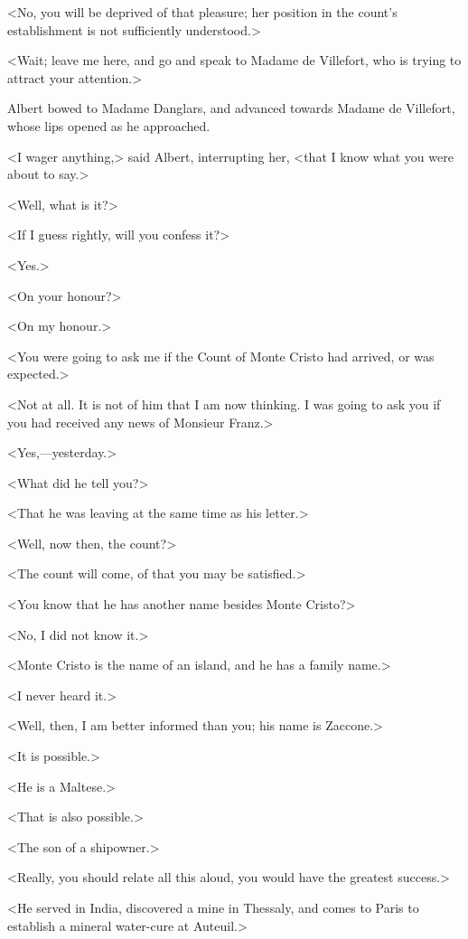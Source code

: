  <No, you will be deprived of that pleasure; her position in the count's establishment is not sufficiently understood.> 

 <Wait; leave me here, and go and speak to Madame de Villefort, who is trying to attract your attention.> 

 Albert bowed to Madame Danglars, and advanced towards Madame de Villefort, whose lips opened as he approached. 

 <I wager anything,> said Albert, interrupting her, <that I know what you were about to say.> 

 <Well, what is it?> 

 <If I guess rightly, will you confess it?> 

 <Yes.> 

 <On your honour?> 

 <On my honour.> 

 <You were going to ask me if the Count of Monte Cristo had arrived, or was expected.> 

 <Not at all. It is not of him that I am now thinking. I was going to ask you if you had received any news of Monsieur Franz.> 

 <Yes,—yesterday.> 

 <What did he tell you?> 

 <That he was leaving at the same time as his letter.> 

 <Well, now then, the count?> 

 <The count will come, of that you may be satisfied.> 

 <You know that he has another name besides Monte Cristo?> 

 <No, I did not know it.> 

 <Monte Cristo is the name of an island, and he has a family name.> 

 <I never heard it.> 

 <Well, then, I am better informed than you; his name is Zaccone.> 

 <It is possible.> 

 <He is a Maltese.> 

<That is also possible.>

 <The son of a shipowner.> 

 <Really, you should relate all this aloud, you would have the greatest success.> 

 <He served in India, discovered a mine in Thessaly, and comes to Paris to establish a mineral water-cure at Auteuil.> 

